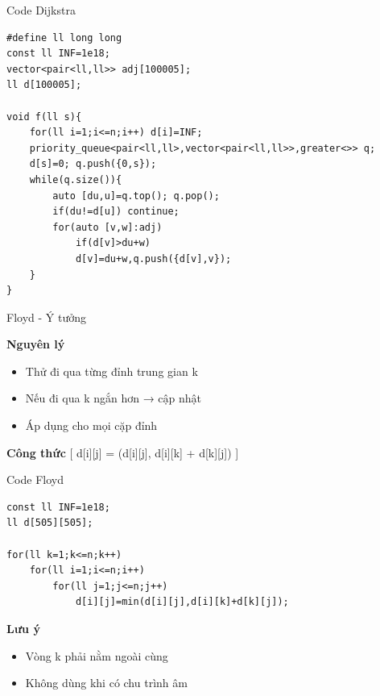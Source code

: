\documentclass{beamer}
\begin{document}
\begin{frame}[fragile]{Code Dijkstra}
\begin{tcolorbox}
\begin{lstlisting}
#define ll long long
const ll INF=1e18;
vector<pair<ll,ll>> adj[100005];
ll d[100005];

void f(ll s){
    for(ll i=1;i<=n;i++) d[i]=INF;
    priority_queue<pair<ll,ll>,vector<pair<ll,ll>>,greater<>> q;
    d[s]=0; q.push({0,s});
    while(q.size()){
        auto [du,u]=q.top(); q.pop();
        if(du!=d[u]) continue;
        for(auto [v,w]:adj)
            if(d[v]>du+w)
            d[v]=du+w,q.push({d[v],v});
    }
}
\end{lstlisting}
\end{tcolorbox}
\end{frame}

\begin{frame}{Floyd - Ý tưởng}

\begin{tcolorbox}
\textbf{\faProjectDiagram Nguyên lý}
\begin{itemize}
\item Thử đi qua từng đỉnh trung gian k
\item Nếu đi qua k ngắn hơn → cập nhật
\item Áp dụng cho mọi cặp đỉnh
\end{itemize}
\end{tcolorbox}

\vspace{0.2cm}

\begin{tcolorbox}
\textbf{\faCalculator Công thức}
[
d[i][j] = \min(d[i][j], d[i][k] + d[k][j])
]
\end{tcolorbox}

\end{frame}

\begin{frame}[fragile]{Code Floyd}
\begin{tcolorbox}
\begin{lstlisting}
const ll INF=1e18;
ll d[505][505];

for(ll k=1;k<=n;k++)
    for(ll i=1;i<=n;i++)
        for(ll j=1;j<=n;j++)
            d[i][j]=min(d[i][j],d[i][k]+d[k][j]);
\end{lstlisting}
\end{tcolorbox}

\vspace{0.2cm}

\begin{tcolorbox}
\textbf{\faExclamationTriangle Lưu ý}
\begin{itemize}
\item Vòng k phải nằm ngoài cùng
\item Không dùng khi có chu trình âm
\end{itemize}
\end{tcolorbox}

\end{frame}
\end{document}
